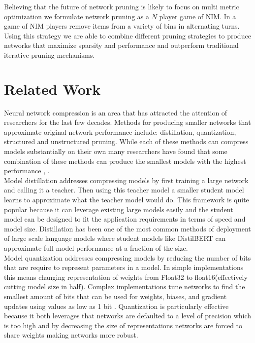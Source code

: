\documentclass[11pt]{article}
\begin{document}
Believing that the future of network pruning is likely to focus on multi metric optimization we formulate network pruning as a $N$ player game of NIM. In a game of NIM \cite{Dass2006SecretsBT} players remove items from a variety of bins in alternating turns. Using this strategy we are able to combine different pruning strategies to produce networks that maximize sparsity and performance and outperform traditional iterative pruning mechanisms. 
\section{Related Work}
Neural network compression is an area that has attracted the attention of researchers for the last few decades. Methods for producing smaller networks that approximate original network performance include: distillation, quantization, structured and unstructured pruning. While each of these methods can compress models substantially on their own many researchers have found that some combination of these methods can produce the smallest models with the highest performance \cite{Polino2018ModelCV}, \cite{Sanh2020MovementPA}. \\
Model distillation \cite{Ba2014DoDN} addresses compressing models by first training a large network and calling it a teacher. Then using this teacher model a smaller student model learns to approximate what the teacher model would do. This framework is quite popular because it can leverage existing large models easily and the student model can be designed to fit the application requirements in terms of speed and model size. Distillation has been one of the most common methods of deployment of large scale language models where student models like DistilBERT \cite{Sanh2019DistilBERTAD} can approximate full model performance at a fraction of the size. \\
Model quantization \cite{Gong2014CompressingDC} \cite{Han2016DeepCC} addresses compressing models by reducing the number of bits that are require to represent parameters in a model. In simple implementations this means changing representation of weights from Float32 to float16(effectively cutting model size in half). Complex implementations tune networks to find the smallest amount of bits that can be used for weights, biases, and gradient updates using values as low as 1 bit \cite{Courbariaux2016BinarizedNN}. Quantization is particularly effective because it both leverages that networks are defaulted to a level of precision which is too high and by decreasing the size of representations networks are forced to share weights making networks more robust. \\
\end{document}
